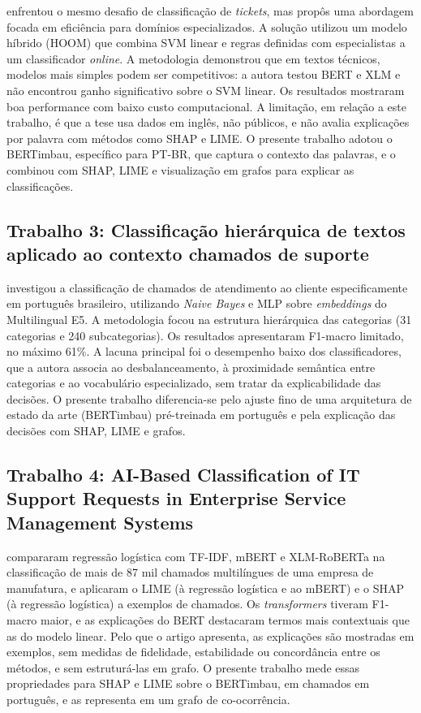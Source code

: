 \documentclass[
    12pt,                %
    openright,           %
    oneside,             %
    a4paper,             %
    english,             %
    brazil               %
]{abntex2}
\begin{document}
 enfrentou o mesmo desafio de classificação de \textit{tickets}, 
mas propôs uma abordagem focada em eficiência para domínios especializados. 
A solução utilizou um modelo híbrido (HOOM) que combina SVM linear e regras 
definidas com especialistas a um classificador \textit{online}. A metodologia 
demonstrou que em textos técnicos, modelos mais simples podem ser competitivos: 
a autora testou BERT e XLM e não encontrou ganho significativo sobre o SVM linear. 
Os resultados mostraram boa performance com baixo custo computacional. A limitação, 
em relação a este trabalho, é que a tese usa dados em inglês, não públicos, e não 
avalia explicações por palavra com métodos como SHAP e LIME. O presente trabalho 
adotou o BERTimbau, específico para PT-BR, que captura o contexto das palavras, 
e o combinou com SHAP, LIME e visualização em grafos para explicar as classificações.

\subsection{Trabalho 3: Classificação hierárquica de textos aplicado ao contexto chamados de suporte}

 investigou a classificação de chamados de atendimento ao cliente especificamente em português brasileiro, utilizando \textit{Naive Bayes} e MLP sobre \textit{embeddings} do Multilingual E5. A metodologia focou na estrutura hierárquica das categorias (31 categorias e 240 subcategorias). Os resultados apresentaram F1-macro limitado, no máximo 61\%. A lacuna principal foi o desempenho baixo dos classificadores, que a autora associa ao desbalanceamento, à proximidade semântica entre categorias e ao vocabulário especializado, sem tratar da explicabilidade das decisões. O presente trabalho diferencia-se pelo ajuste fino de uma arquitetura de estado da arte (BERTimbau) pré-treinada em português e pela explicação das decisões com SHAP, LIME e grafos.

\subsection{Trabalho 4: AI-Based Classification of IT Support Requests in Enterprise Service Management Systems}

 compararam regressão logística com TF-IDF, mBERT e XLM-RoBERTa na classificação de mais de 87 mil chamados multilíngues de uma empresa de manufatura, e aplicaram o LIME (à regressão logística e ao mBERT) e o SHAP (à regressão logística) a exemplos de chamados. Os \textit{transformers} tiveram F1-macro maior, e as explicações do BERT destacaram termos mais contextuais que as do modelo linear. Pelo que o artigo apresenta, as explicações são mostradas em exemplos, sem medidas de fidelidade, estabilidade ou concordância entre os métodos, e sem estruturá-las em grafo. O presente trabalho mede essas propriedades para SHAP e LIME sobre o BERTimbau, em chamados em português, e as representa em um grafo de co-ocorrência.
\end{document}
